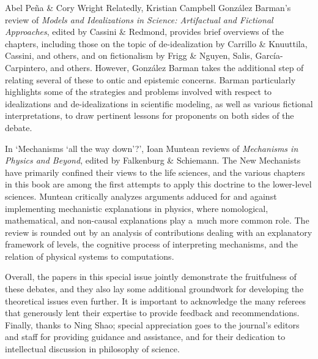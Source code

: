\begin{editorialeng}{Abel Peña \& Cory Wright}
Relatedly, Kristian Campbell González Barman's review of \textit{Models and Idealizations in Science: Artifactual and Fictional Approaches}, edited by Cassini \& Redmond, provides brief overviews of the chapters, including those on the topic of de-idealization by Carrillo \& Knuuttila, Cassini, and others, and on fictionalism by Frigg \& Nguyen, Salis, García-Carpintero, and others. However, González Barman takes the additional step of relating several of these to ontic and epistemic concerns. Barman particularly highlights some of the strategies and problems involved with respect to idealizations and de-idealizations in scientific modeling, as well as various fictional interpretations, to draw pertinent lessons for proponents on both sides of the debate.

\enlargethispage{1.5\baselineskip}
In `Mechanisms `all the way down'?', Ioan Muntean reviews of \textit{Mechanisms in Physics and Beyond}, edited by Falkenburg \& Schiemann. The New Mechanists have primarily confined their views to the life sciences, and the various chapters in this book are among the first attempts to apply this doctrine to the lower-level sciences. Muntean critically analyzes arguments adduced for and against implementing mechanistic explanations in physics, where nomological, mathematical, and non-causal explanations play a~much more common role. The review is rounded out by an analysis of contributions dealing with an explanatory framework of levels, the cognitive process of interpreting mechanisms, and the relation of physical systems to computations.

Overall, the papers in this special issue jointly demonstrate the fruitfulness of these debates, and they also lay some additional groundwork for developing the theoretical issues even further. It is important to acknowledge the many referees that generously lent their expertise to provide feedback and recommendations. Finally, thanks to Ning Shao; special appreciation goes to the journal's editors and staff for providing guidance and assistance, and for their dedication to intellectual discussion in philosophy of science.


\end{editorialeng}
